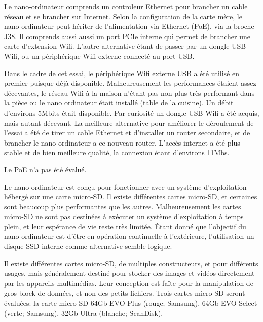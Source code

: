 \par [TODO ajout photo] 
\par Le nano-ordinateur comprends un controleur Ethernet pour brancher un cable réseau et se brancher sur Internet. Selon la configuration de la carte mère, le nano-ordinateur peut hériter de l'alimentation via Ethernet (PoE), via la broche J38. Il comprends aussi aussi un port PCIe interne qui permet de brancher une carte d'extension Wifi. L'autre alternative étant de passer par un dongle USB Wifi, ou un périphérique Wifi externe connecté au port USB. 
\par Dans le cadre de cet essai, le périphérique Wifi externe USB a été utilisé en premier puisque déjà disponible. Malheureusement les performances étaient assez décevantes, le réseau Wifi à la maison n'étant pas non plus très performant dans la pièce ou le nano ordinateur était installé (table de la cuisine). Un débit d'environs 5Mbits était disponible. Par curiosité un dongle USB Wifi a été acquis, mais autant décevant. La meilleure alternative pour améliorer le déroulement de l'essai a été de tirer un cable Ethernet et d'installer un router secondaire, et de brancher le nano-ordinateur a ce nouveau router. L'accès internet a été plus stable et de bien meilleure qualité, la connexion étant d'environs 11Mbs. 
\par Le PoE n'a pas été évalué. 
\par Le nano-ordinateur est conçu pour fonctionner avec un système  d'exploitation hébergé sur une carte micro-SD. Il existe différentes cartes micro-SD, et certaines sont  beaucoup plus performantes que les autres. Malheureusement les cartes micro-SD ne sont pas destinées à exécuter un système d'exploitation à temps plein, et leur espérance de vie reste très limitée.  Étant donné que l'objectif du nano-ordinateur est d'être en opération continuelle à l'extérieure, l'utilisation un disque SSD interne comme alternative semble logique.
\par Il existe différentes cartes micro-SD, de multiples constructeurs, et pour différents usages, mais généralement destiné pour stocker des images et vidéos directement par les appareils multimédias. Leur conception est faîte pour la manipulation de gros block de données, et non des petits fichiers. Trois cartes micro-SD 
seront évaluées: la carte micro-SD 64Gb EVO Plus (rouge; Samsung), 64Gb EVO Select (verte; Samsung), 32Gb Ultra (blanche; ScanDisk).
